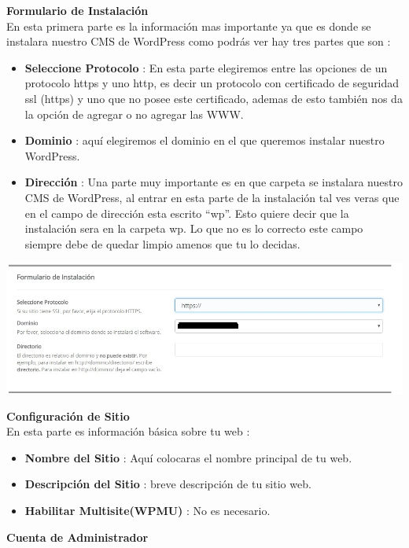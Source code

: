 		\textbf{Formulario de Instalación}\\
		
		En esta primera parte es la información mas importante ya que es donde se instalara nuestro CMS de WordPress como podrás ver  hay tres partes que son :
		
		\begin{itemize}
			\item 	\textbf{Seleccione Protocolo} : En esta parte elegiremos entre las opciones de un protocolo https y uno http, es decir un protocolo con certificado de seguridad ssl (https) y uno que no posee este certificado, ademas de esto también nos da la opción de agregar o no agregar las WWW.
			\item \textbf{Dominio} : aquí elegiremos el dominio en el que queremos instalar nuestro WordPress.
			\item \textbf{Dirección} : Una parte muy importante es en que carpeta se instalara nuestro CMS de WordPress, al entrar en esta parte de la instalación tal ves veras que en el campo de dirección esta escrito “wp”. Esto quiere decir que la instalación sera en la carpeta wp. Lo que no es lo correcto este campo siempre debe de quedar limpio amenos que tu lo decidas.
		\end{itemize}
		
		\begin{center}
			\includegraphics[scale=0.48]{image/image3.jpg}
		\end{center}
	
		\textbf{Configuración de Sitio}\\
		
		En esta parte es información básica sobre tu web :
		
		\begin{itemize}
			\item \textbf{Nombre del Sitio} : Aquí colocaras el nombre principal de tu web.
			\item \textbf{Descripción del Sitio} : breve descripción de tu sitio web.
			\item \textbf{Habilitar Multisite(WPMU)} : No es necesario.
		\end{itemize}
		\newpage
		\textbf{Cuenta de Administrador}\\
		
